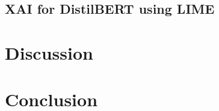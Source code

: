 \documentclass[
  pdftex,
  10pt,
  a4paper,
  oneside
]{article}
\begin{document}
  \newpage

  \subsection{XAI for DistilBERT using LIME}
  

  \newpage

  

  \newpage

  

  \newpage

  \section{Discussion}\label{sec:5-discussion}
  \newpage

  \section{Conclusion}\label{sec:6-conclusion}
  \newpage

  
  
  \newpage

  
\end{document}
